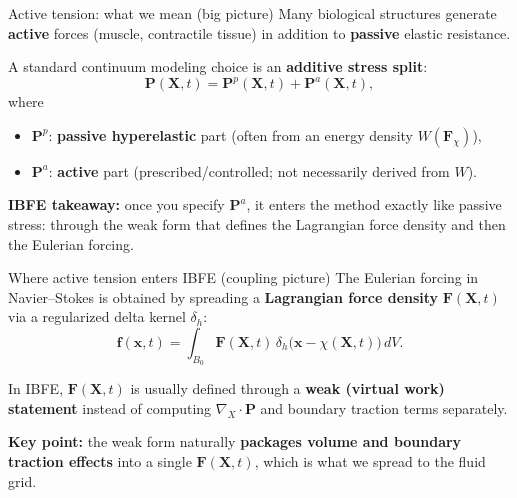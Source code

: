 \documentclass[aspectratio=169]{beamer}
\newcommand{\x}{\bm{x}}
\newcommand{\X}{\bm{X}}
\newcommand{\divX}{\nabla_{\!X}\!\cdot}
\newcommand{\Pten}{\bm{P}}        %
\newcommand{\Fdef}{\bm{F}_{\chi}} %
\newcommand{\FLag}{\bm{F}}       %
\newcommand{\fEuler}{\bm{f}}     %
\newcommand{\deltah}{\delta_h}   %
\begin{document}
\begin{frame}{Active tension: what we mean (big picture)}
\small
Many biological structures generate \textbf{active} forces (muscle, contractile tissue) in addition to
\textbf{passive} elastic resistance.

\medskip
A standard continuum modeling choice is an \textbf{additive stress split}:
\[
\Pten(\X,t) = \Pten^{p}(\X,t) + \Pten^{a}(\X,t),
\]
where
\begin{itemize}
\item \(\Pten^{p}\): \textbf{passive hyperelastic} part (often from an energy density \(W(\Fdef)\)),
\item \(\Pten^{a}\): \textbf{active} part (prescribed/controlled; not necessarily derived from \(W\)).
\end{itemize}

\medskip
\textbf{IBFE takeaway:} once you specify \(\Pten^{a}\), it enters the method exactly like passive stress:
through the weak form that defines the Lagrangian force density and then the Eulerian forcing.
\end{frame}

\begin{frame}{Where active tension enters IBFE (coupling picture)}
\small
The Eulerian forcing in Navier--Stokes is obtained by spreading a \textbf{Lagrangian force density}
\(\FLag(\X,t)\) via a regularized delta kernel \(\deltah\):
\[
\fEuler(\x,t)=\int_{B_0}\FLag(\X,t)\,\deltah\!\big(\x-\chi(\X,t)\big)\,dV.
\]

\medskip
In IBFE, \(\FLag(\X,t)\) is usually defined through a \textbf{weak (virtual work) statement}
instead of computing \(\divX\Pten\) and boundary traction terms separately.

\medskip
\textbf{Key point:} the weak form naturally \textbf{packages volume and boundary traction effects}
into a single \(\FLag(\X,t)\), which is what we spread to the fluid grid.
\end{frame}
\end{document}
